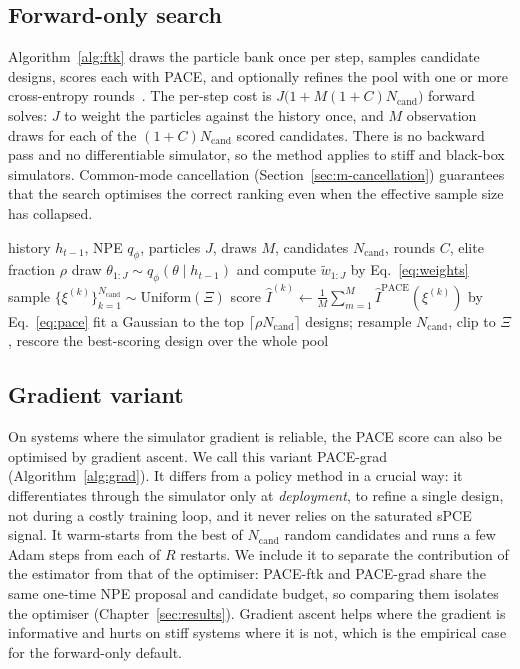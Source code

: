 \subsection{Forward-only search}
\label{sec:m-ftk}

Algorithm~\ref{alg:ftk} draws the particle bank once per step, samples candidate
designs, scores each with PACE, and optionally refines the pool with one or more
cross-entropy rounds~\citep{rubinstein2004cross}. The per-step cost is
$J\big(1+M(1+C)N_{\mathrm{cand}}\big)$ forward solves: $J$ to weight the particles
against the history once, and $M$ observation draws for each of the
$(1+C)N_{\mathrm{cand}}$ scored candidates. There is no backward pass and no
differentiable simulator, so the method applies to stiff and black-box simulators.
Common-mode cancellation (Section~\ref{sec:m-cancellation}) guarantees that the search
optimises the correct ranking even when the effective sample size has collapsed.

\begin{algorithm}[t]
\caption{Forward-only design search (PACE-ftk) at step $t$}
\label{alg:ftk}
\begin{algorithmic}[1]
\Require history $h_{t-1}$, NPE $q_\phi$, particles $J$, draws $M$, candidates
$N_{\mathrm{cand}}$, rounds $C$, elite fraction $\rho$
\State draw $\theta_{1:J}\sim q_\phi(\theta\mid h_{t-1})$ and compute
$\tilde w_{1:J}$ by Eq.~\eqref{eq:weights}
\State sample $\{\xi^{(k)}\}_{k=1}^{N_{\mathrm{cand}}}\sim\mathrm{Uniform}(\Xi)$
  \State score $\hat I^{(k)}\gets\frac1M\sum_{m=1}^{M}\hat I^{\mathrm{PACE}}(\xi^{(k)})$ by Eq.~\eqref{eq:pace} 
\EndFor
{}
  \State fit a Gaussian to the top $\lceil\rho N_{\mathrm{cand}}\rceil$ designs; resample $N_{\mathrm{cand}}$, clip to $\Xi$, rescore
\EndFor
\State \Return the best-scoring design over the whole pool
\end{algorithmic}
\end{algorithm}

\subsection{Gradient variant}
\label{sec:m-grad}

On systems where the simulator gradient is reliable, the PACE score can also be
optimised by gradient ascent. We call this variant PACE-grad
(Algorithm~\ref{alg:grad}). It differs from a policy method in a crucial way: it
differentiates through the simulator only at \emph{deployment}, to refine a single
design, not during a costly training loop, and it never relies on the saturated sPCE
signal. It warm-starts from the best of $N_{\mathrm{cand}}$ random candidates and runs
a few Adam steps from each of $R$ restarts. We include it to separate the contribution
of the estimator from that of the optimiser: PACE-ftk and PACE-grad share the same
one-time NPE proposal and candidate budget, so comparing them isolates the optimiser
(Chapter~\ref{sec:results}). Gradient ascent helps where the gradient is informative
and hurts on stiff systems where it is not, which is the empirical case for the
forward-only default.

